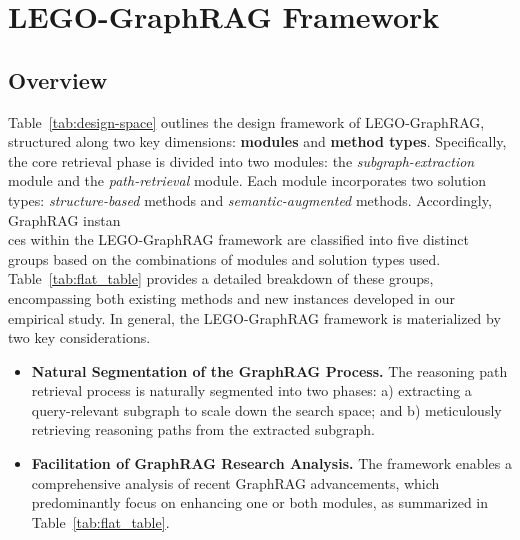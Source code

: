 

\section{LEGO-GraphRAG Framework}
\label{section: Modular GraphRAG}



\subsection{Overview}
Table~\ref{tab:design-space} outlines the design framework of LEGO-GraphRAG, structured along two key dimensions: {\bf modules} and {\bf method types}. Specifically, the core retrieval phase is divided into two modules: the \textit{subgraph-extraction} module and the \textit{path-retrieval} module. Each module incorporates two solution types: \textit{structure-based} methods and \textit{semantic-augmented} methods.
Accordingly, GraphRAG instan\\ces within the LEGO-GraphRAG framework are classified into five distinct groups based on the combinations of modules and solution types used.  
Table~\ref{tab:flat_table} provides a detailed breakdown of these groups, encompassing both existing methods and new instances developed in our empirical study.
In general, the LEGO-GraphRAG framework is materialized by two key considerations.
\begin{itemize}[leftmargin=10pt]
    \item {\bf Natural Segmentation of the GraphRAG Process.} 
    The reasoning path retrieval process is naturally segmented into two phases:
    a) extracting a query-relevant subgraph to scale down the search space; and b) meticulously retrieving reasoning paths from the extracted subgraph.
    \item %
    {\bf Facilitation of GraphRAG Research Analysis.} 
    The framework enables a comprehensive analysis of recent GraphRAG advancements, which predominantly focus on enhancing one or both modules, as summarized in Table~\ref{tab:flat_table}. 
\end{itemize}

